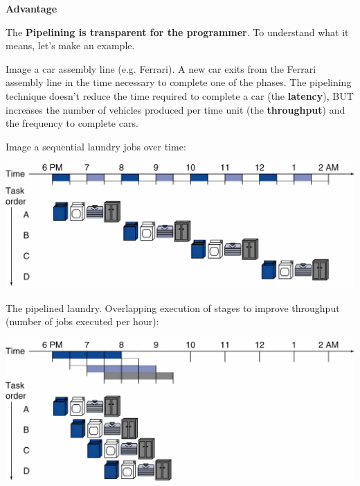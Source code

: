 \documentclass[a4paper]{article}
\begin{document}
    \begin{flushleft}
        \textcolor{Green3}{ \textbf{Advantage}}
    \end{flushleft}
    The \textbf{Pipelining is transparent for the programmer}. To understand what it means, let's make an example.

    \begin{examplebox}
        Image a car assembly line (e.g. Ferrari). A new car exits from the Ferrari assembly line in the time necessary to complete one of the phases. The pipelining technique doesn't reduce the time required to complete a car (the \textbf{latency}), BUT increases the number of vehicles produced per time unit (the \textbf{throughput}) and the frequency to complete cars.
    \end{examplebox}

    \newpage

    \begin{examplebox}
        Image a sequential laundry jobs over time:\cite{pipelining-slides}
        \begin{center}
            \centering
            \includegraphics[width=.9\textwidth]{img/pipelining-example-1.pdf}
        \end{center}
        The pipelined laundry. Overlapping execution of stages to improve throughput (number of jobs executed per hour):\cite{pipelining-slides}
        \begin{center}
            \centering
            \includegraphics[width=.9\textwidth]{img/pipelining-example-2.pdf}
        \end{center}
    \end{examplebox}
\end{document}
